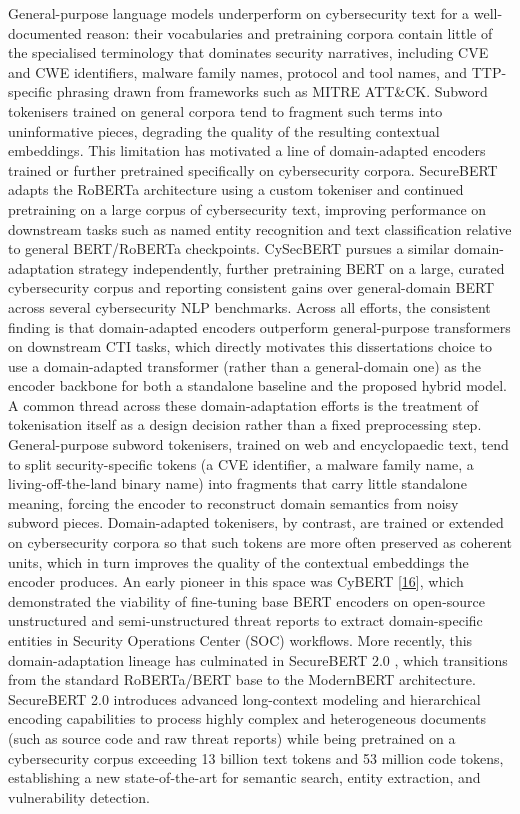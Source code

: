 \documentclass[12pt,a4paper]{report}
\begin{document}
General-purpose language models underperform on cybersecurity text for a
well-documented reason: their vocabularies and pretraining corpora
contain little of the specialised terminology that dominates security
narratives, including CVE and CWE identifiers, malware family names,
protocol and tool names, and TTP-specific phrasing drawn from frameworks
such as MITRE ATT\&CK. Subword tokenisers trained on general corpora
tend to fragment such terms into uninformative pieces, degrading the
quality of the resulting contextual embeddings. This limitation has
motivated a line of domain-adapted encoders trained or further
pretrained specifically on cybersecurity corpora. SecureBERT
\cite{securebert2022}
adapts the RoBERTa architecture using a custom tokeniser and continued
pretraining on a large corpus of cybersecurity text, improving
performance on downstream tasks such as named entity recognition and
text classification relative to general BERT/RoBERTa checkpoints.
CySecBERT
\cite{cysecbert2022}
pursues a similar domain-adaptation strategy independently, further
pretraining BERT on a large, curated cybersecurity corpus and reporting
consistent gains over general-domain BERT across several cybersecurity
NLP benchmarks. Across all efforts, the consistent finding is that
domain-adapted encoders outperform general-purpose transformers on
downstream CTI tasks, which directly motivates this
dissertation\textquotesingle s choice to use a domain-adapted
transformer (rather than a general-domain one) as the encoder backbone
for both a standalone baseline and the proposed hybrid model. A common
thread across these domain-adaptation efforts is the treatment of
tokenisation itself as a design decision rather than a fixed
preprocessing step. General-purpose subword tokenisers, trained on web
and encyclopaedic text, tend to split security-specific tokens (a CVE
identifier, a malware family name, a living-off-the-land binary name)
into fragments that carry little standalone meaning, forcing the encoder
to reconstruct domain semantics from noisy subword pieces.
Domain-adapted tokenisers, by contrast, are trained or extended on
cybersecurity corpora so that such tokens are more often preserved as
coherent units, which in turn improves the quality of the contextual
embeddings the encoder produces. An early pioneer in this space was
CyBERT
{[}\href{file:///D:/Downloads/literature-review-and-references-updated.docx\#ref_16}{\ul{16}}{]},
which demonstrated the viability of fine-tuning base BERT encoders on
open-source unstructured and semi-unstructured threat reports to extract
domain-specific entities in Security Operations Center (SOC) workflows.
More recently, this domain-adaptation lineage has culminated in
SecureBERT 2.0
\cite{securebert2025},
which transitions from the standard RoBERTa/BERT base to the ModernBERT
architecture. SecureBERT 2.0 introduces advanced long-context modeling
and hierarchical encoding capabilities to process highly complex and
heterogeneous documents (such as source code and raw threat reports)
while being pretrained on a cybersecurity corpus exceeding 13 billion
text tokens and 53 million code tokens, establishing a new
state-of-the-art for semantic search, entity extraction, and
vulnerability detection.
\end{document}
